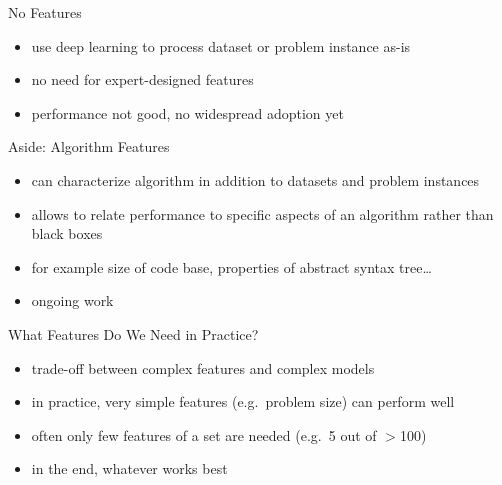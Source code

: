\begin{frame}{No Features}
    \begin{itemize}
        \item use deep learning to process dataset or problem instance as-is
        \item no need for expert-designed features
        \item performance not good, no widespread adoption yet
    \end{itemize}
\end{frame}

\begin{frame}{Aside: Algorithm Features}
    \begin{itemize}
        \item can characterize algorithm in addition to datasets and problem
            instances
        \item allows to relate performance to specific aspects of an algorithm
            rather than black boxes
        \item for example size of code base, properties of abstract syntax
            tree\ldots
        \item ongoing work
    \end{itemize}
\end{frame}

\begin{frame}{What Features Do We Need in Practice?}
    \begin{itemize}
        \item trade-off between complex features and complex models
        \item in practice, very simple features (e.g.\ problem size) can perform well
        \item often only few features of a set are needed (e.g.\ 5 out of $>$100)
        \item in the end, whatever works best
    \end{itemize}
\end{frame}


